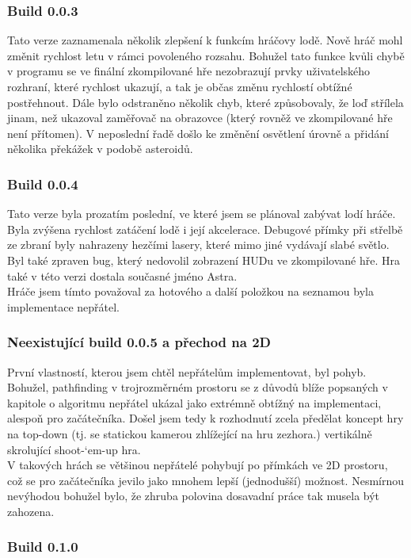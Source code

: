 \documentclass[12pt,a4paper,hidelinks]{article}
\begin{document}
\subsubsection{Build 0.0.3}
Tato verze zaznamenala několik zlepšení k funkcím hráčovy lodě. Nově hráč mohl změnit rychlost letu v rámci povoleného rozsahu. Bohužel tato funkce kvůli chybě v programu se ve finální zkompilované hře nezobrazují prvky uživatelského rozhraní, které rychlost ukazují, a tak je občas změnu rychlostí obtížné postřehnout. Dále bylo odstraněno několik chyb, které způsobovaly, že loď střílela jinam, než ukazoval zaměřovač na obrazovce (který rovněž ve zkompilované hře není přítomen). V neposlední řadě došlo ke změnění osvětlení úrovně a přidání několika překážek v podobě asteroidů.\\
\subsubsection{Build 0.0.4}
Tato verze byla prozatím poslední, ve které jsem se plánoval zabývat lodí hráče. Byla zvýšena rychlost zatáčení lodě i její akcelerace. Debugové přímky při střelbě ze zbraní byly nahrazeny hezčími lasery, které mimo jiné vydávají slabé světlo. Byl také zpraven bug, který nedovolil zobrazení HUDu ve zkompilované hře. Hra také v této verzi dostala současné jméno Astra.\\
Hráče jsem tímto považoval za hotového a další položkou na seznamou byla implementace nepřátel.\\
\subsubsection{Neexistující build 0.0.5 a přechod na 2D}
První vlastností, kterou jsem chtěl nepřátelům implementovat, byl pohyb. Bohužel, pathfinding v trojrozměrném prostoru se z důvodů blíže popsaných v kapitole o algoritmu nepřátel ukázal jako extrémně obtížný na implementaci, alespoň pro začátečníka. Došel jsem tedy k rozhodnutí zcela předělat koncept hry na top-down (tj. se statickou kamerou zhlížející na hru zezhora.) vertikálně skrolující shoot-‘em-up hra.\\
V takových hrách se většinou nepřátelé pohybují po přímkách ve 2D prostoru, což se pro začátečníka jevilo jako mnohem lepší (jednodušší) možnost. Nesmírnou nevýhodou bohužel bylo, že zhruba polovina dosavadní práce tak musela být zahozena.\\
\subsubsection{Build 0.1.0}
\end{document}
